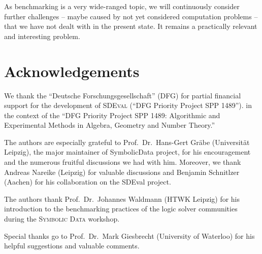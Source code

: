 \documentclass[12pt]{article}
\begin{document}
As benchmarking is a very wide-ranged topic, we will continuously consider
further challenges -- maybe caused by not yet considered computation problems
-- that we have not dealt with in the present state.  It remains a practically
relevant and interesting problem.

\section*{Acknowledgements}

We thank the ``Deutsche Forschungsgesellschaft'' (DFG) for partial financial
support for the development of \textsc{SDEval} (``DFG Priority Project SPP
1489'').  in the context of the ``DFG Priority Project SPP 1489: Algorithmic
and Experimental Methods in Algebra, Geometry and Number Theory.''


The authors are especially grateful to Prof.~Dr.~Hans-Gert Gr\"abe
(Universit\"at Leipzig), the major maintainer of {\sc SymbolicData} project,
for his encouragement and the numerous fruitful discussions we had with
him. Moreover, we thank Andreas Nareike (Leipzig) for valuable discussions and
Benjamin Schnitlzer (Aachen) for his collaboration on the {\sc SDEval} project.

The authors thank Prof.~Dr.~Johannes Waldmann (HTWK Leipzig) for his
introduction to the benchmarking practices of the logic solver communities
during the \textsc{Symbolic Data} workshop.

Special thanks go to Prof.~Dr.~Mark Giesbrecht (University of Waterloo) for his
helpful suggestions and valuable comments.

\end{document}
